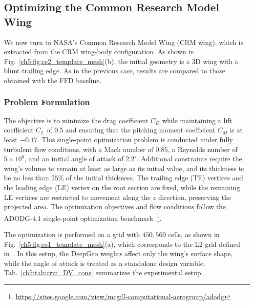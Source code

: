 \subsection{Optimizing the Common Research Model Wing}
\label{ch5:sec:cs2}

We now turn to NASA's Common Research Model Wing (CRM wing), which is extracted from the CRM wing-body configuration. As shown in Fig.~\ref{ch5:fig:cs2_template_mesh}(b), the initial geometry is a 3D wing with a blunt trailing edge. As in the previous case, results are compared to those obtained with the FFD baseline.

\subsubsection{Problem Formulation}

The objective is to minimize the drag coefficient $C_D$ while maintaining a lift coefficient $C_L$ of $0.5$ and ensuring that the pitching moment coefficient $C_M$ is at least $-0.17$. This single-point optimization problem is conducted under fully turbulent flow conditions, with a Mach number of $0.85$, a Reynolds number of $5 \times 10^6$, and an initial angle of attack of $2.2^{\circ}$. Additional constraints require the wing's volume to remain at least as large as its initial value, and its thickness to be no less than $25\%$ of the initial thickness. The trailing edge (TE) vertices and the leading edge (LE) vertex on the root section are fixed, while the remaining LE vertices are restricted to movement along the $z$ direction, preserving the projected area.
The optimization objectives and flow conditions follow the ADODG-4.1 single-point optimization benchmark~\footnote{\url{https://sites.google.com/view/mcgill-computational-aerogroup/adodg}}.

The optimization is performed on a grid with $450,560$ cells, as shown in Fig.~\ref{ch5:fig:cs1_template_mesh}(a), which corresponds to the L2 grid defined in~\citet{aa.Lyu2015}. In this setup, the DeepGeo weights affect only the wing’s surface shape, while the angle of attack is treated as a standalone design variable. Tab.~\ref{ch5:tab:crm_DV_cons} summarizes the experimental setup.

